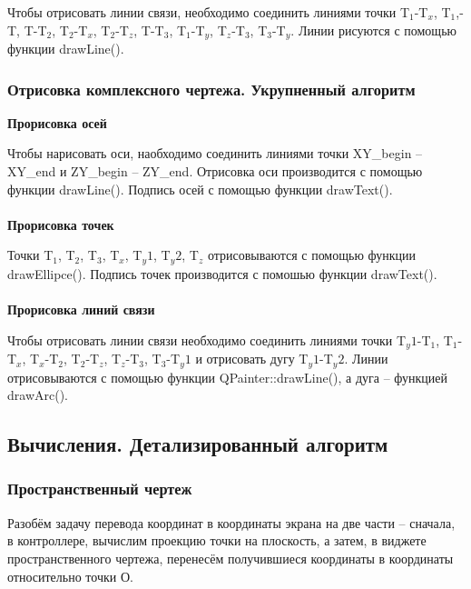 \documentclass[13pt]{extarticle}
\begin{document}
Чтобы отрисовать линии связи, необходимо соединить линиями точки T$_1$-T$_x$, T$_1$,-T, T-T$_2$, T$_2$-T$_x$, T$_2$-T$_z$, T-T$_3$, T$_1$-T$_y$, T$_z$-T$_3$, T$_3$-T$_y$. Линии рисуются с помощью функции drawLine().

\subsubsection{Отрисовка комплексного чертежа. Укрупненный алгоритм}
\textbf{Прорисовка осей}

Чтобы нарисовать оси, наобходимо соединить линиями точки XY\_begin -- XY\_end и ZY\_begin -- ZY\_end. Отрисовка оси производится с помощью функции drawLine(). Подпись осей с помощью функции drawText().\\
\\
\textbf{Прорисовка точек}

Точки T$_1$, T$_2$, T$_3$, T$_x$, T$_y1$, T$_y2$, T$_z$ отрисовываются с помощью функции drawEllipce(). Подпись точек производится с помошью функции drawText().\\
\\
\textbf{Прорисовка линий связи}

Чтобы отрисовать линии связи необходимо соединить линиями точки T$_y1$-T$_1$, T$_1$-T$_x$, T$_x$-T$_2$, T$_2$-T$_z$, T$_z$-T$_3$, T$_3$-T$_y1$ и отрисовать дугу T$_y1$-T$_y2$. Линии отрисовываются с помощью функции QPainter::drawLine(), а дуга -- функцией drawArc().

\subsection{Вычисления. Детализированный алгоритм}
\subsubsection{Пространственный чертеж}

Разобём задачу перевода координат в координаты экрана на две части -- сначала, в контроллере, вычислим проекцию точки на плоскость, а затем, в виджете пространственного чертежа, перенесём получившиеся координаты в координаты относительно точки О.
\end{document}
